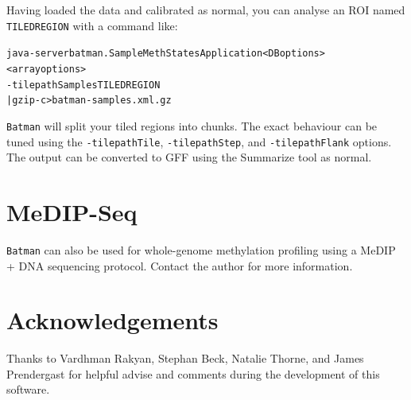 \documentclass[a4paper, 11pt]{article}
\newcommand{\bm}{{\tt Batman}\xspace}
\begin{document}
Having loaded the data and calibrated as normal, you can analyse an ROI named {\tt TILEDREGION}
with a command like:

\begin{alltt}java -server batman.SampleMethStatesApplication <DB options> 
           <array options> 
           -tilepathSamples TILEDREGION
           | gzip -c >batman-samples.xml.gz\end{alltt}

\bm will split your tiled regions into chunks.  The exact behaviour can be tuned using
the {\tt -tilepathTile}, {\tt -tilepathStep}, and {\tt -tilepathFlank} options.  The output
can be converted to GFF using the Summarize tool as normal.

\section{MeDIP-Seq}

{\tt Batman} can also be used for whole-genome methylation profiling using a
MeDIP + DNA sequencing protocol.  Contact the author for more information.

\section{Acknowledgements}

Thanks to Vardhman Rakyan, Stephan Beck, Natalie Thorne, and James Prendergast for
helpful advise and comments during the development of this software.
\end{document}
